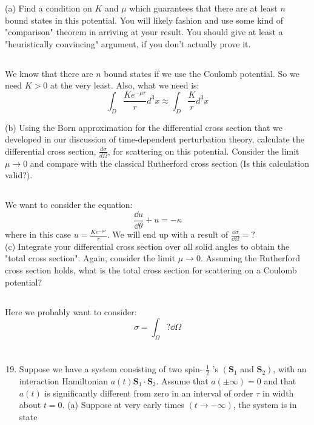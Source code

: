 \documentclass[12pt]{article}
\begin{document}
(a) Find a condition on $K$ and $\mu$ which guarantees that there are at least $n$ bound states in this potential. You will likely fashion and use some kind of "comparison" theorem in arriving at your result. You should give at least a "heuristically convincing" argument, if you don't actually prove it.
\subsection{}
We know that there are $n$ bound states if we use the Coulomb potential. So we need $K>0$ at the very least. Also, what we need is:
\begin{equation}
  \int_{D} \frac{K e^{-\mu r}}{r} d^{3} x \approx \int_{D} \frac{K}{r} d^{3} x
\end{equation}

(b) Using the Born approximation for the differential cross section that we developed in our discussion of time-dependent perturbation theory, calculate the differential cross section, $\frac{d \sigma}{d \Omega}$, for scattering on this potential. Consider the limit $\mu \rightarrow 0$ and compare with the classical Rutherford cross section (Is this calculation valid?).
\subsection{}
We want to consider the equation:
\begin{equation}
  \frac{\dd{ u}}{\dd{\theta }} +u = - \kappa 
\end{equation}
where in this case $u= \frac{Ke^{-\mu r }}{r}$. We will end up with a result of $\frac{\dd{\sigma }}{\dd{\Omega }}=?$\\
(c) Integrate your differential cross section over all solid angles to obtain the "total cross section". Again, consider the limit $\mu \rightarrow 0$. Assuming the Rutherford cross section holds, what is the total cross section for scattering on a Coulomb potential?
\subsection{}
Here we probably want to consider:
\begin{equation}
  \sigma = \int_{\Omega }? \dd{\Omega } 
\end{equation}
\section{}
\begin{enumerate}
  \setcounter{enumi}{18}
  \item Suppose we have a system consisting of two spin- $\frac{1}{2}$ 's $\left(\mathbf{S}_{1}\right.$ and $\left.\mathbf{S}_{2}\right)$, with an interaction Hamiltonian $a(t) \mathbf{S}_{1} \cdot \mathbf{S}_{2}$. Assume that $a( \pm \infty)=0$ and that $a(t)$ is significantly different from zero in an interval of order $\tau$ in width about $t=0$.
(a) Suppose at very early times $(t \rightarrow-\infty)$, the system is in state
\end{enumerate}
\end{document}
